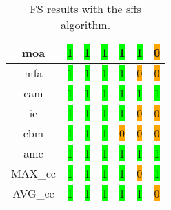 \begin{table}[H]
\begin{tabular}{|c|c|c|c|c|c|c|}
        \acrshort{moa} & \colorbox{lime}{1} & \colorbox{lime}{1} & \colorbox{lime}{1} & \colorbox{lime}{1} & \colorbox{lime}{1} & \colorbox{orange}{0} \\ \hline
        \acrshort{mfa} & \colorbox{lime}{1} & \colorbox{lime}{1} & \colorbox{lime}{1} & \colorbox{lime}{1} & \colorbox{orange}{0} & \colorbox{orange}{0} \\ \hline
        \acrshort{cam} & \colorbox{lime}{1} & \colorbox{lime}{1} & \colorbox{lime}{1} & \colorbox{lime}{1} & \colorbox{lime}{1} & \colorbox{lime}{1} \\ \hline
        \acrshort{ic} & \colorbox{lime}{1} & \colorbox{lime}{1} & \colorbox{lime}{1} & \colorbox{lime}{1} & \colorbox{orange}{0} & \colorbox{orange}{0} \\ \hline
        \acrshort{cbm} & \colorbox{lime}{1} & \colorbox{lime}{1} & \colorbox{lime}{1} & \colorbox{orange}{0} & \colorbox{orange}{0} & \colorbox{orange}{0} \\ \hline
        \acrshort{amc} & \colorbox{lime}{1} & \colorbox{lime}{1} & \colorbox{lime}{1} & \colorbox{lime}{1} & \colorbox{lime}{1} & \colorbox{lime}{1} \\ \hline
        MAX\_\acrshort{cc} & \colorbox{lime}{1} & \colorbox{lime}{1} & \colorbox{lime}{1} & \colorbox{lime}{1} & \colorbox{orange}{0} & \colorbox{lime}{1} \\ \hline
        AVG\_\acrshort{cc} & \colorbox{lime}{1} & \colorbox{lime}{1} & \colorbox{lime}{1} & \colorbox{lime}{1} & \colorbox{lime}{1} & \colorbox{orange}{0} \\ \hline
    \end{tabular}
\caption{FS results with the \acrlong{sffs} algorithm.}
\label{tab:sffs-output}
\end{table}

